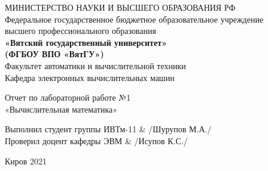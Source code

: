 \thispagestyle{empty}
\begin{center}
    МИНИСТЕРСТВО НАУКИ И ВЫСШЕГО ОБРАЗОВАНИЯ РФ\\
    Федеральное государственное бюджетное образовательное учреждение\\
    высшего профессионального образования\\
    {\bf«Вятский государственный университет»}\\
    {\bf(ФГБОУ ВПО «ВятГУ»)}\\
    Факультет автоматики и вычислительной техники\\
    Кафедра электронных вычислительных машин
\end{center}
\vfill %
\begin{center}
    Отчет по лабораторной работе №1\\
    «Вычислительная математика»
\end{center}

\vfill
\begin{flushleft}
    Выполнил студент группы ИВТм-11 & \hrulefill /Шурупов М.А./\\
    Проверил доцент кафедры ЭВМ & \hrulefill  /Исупов К.С./
\end{flushleft}
\vfill %

\begin{center}
    Киров 2021
\end{center}
\newpage